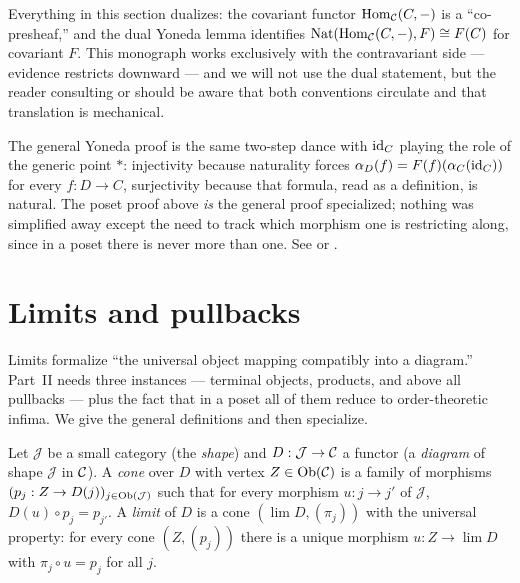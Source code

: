 \begin{remark}\label{ch02:rem:covariant-yoneda}
Everything in this section dualizes: the covariant functor
$\mathrm{Hom}_{\mathcal{C}}(C, -)$ is a ``co-presheaf,'' and the dual Yoneda lemma
identifies $\mathrm{Nat}(\mathrm{Hom}_{\mathcal{C}}(C, -), F) \cong F(C)$ for
covariant $F$. This monograph works exclusively with the
contravariant side --- evidence restricts downward --- and we will
not use the dual statement, but the reader consulting
\cite{maclanecwm} or \cite{riehl} should be aware that both
conventions circulate and that translation is mechanical.
\end{remark}

\begin{remark}\label{ch02:rem:yoneda-general}
The general Yoneda proof is the same two-step dance with $\mathrm{id}_C$
playing the role of the generic point $\ast$: injectivity because
naturality forces $\alpha_D(f) = F(f)(\alpha_C(\mathrm{id}_C))$ for every
$f : D \to C$, surjectivity because that formula, read as a
definition, is natural. The poset proof above \emph{is} the general
proof specialized; nothing was simplified away except the need to
track which morphism one is restricting along, since in a poset there
is never more than one. See \cite[Ch.~2]{riehl} or
\cite[Ch.~8]{awodey}.
\end{remark}

\section{Limits and pullbacks}\label{ch02:sec:limits}

Limits formalize ``the universal object mapping compatibly into a
diagram.'' Part~II needs three instances --- terminal objects, products,
and above all pullbacks --- plus the fact that in a poset all of them
reduce to order-theoretic infima. We give the general definitions and
then specialize.

\begin{definition}\label{ch02:def:limit}
Let $\mathcal{J}$ be a small category (the \emph{shape}) and
$D : \mathcal{J} \to \mathcal{C}$ a functor (a \emph{diagram} of shape
$\mathcal{J}$ in $\mathcal{C}$). A \emph{cone} over $D$ with vertex
$Z \in \mathrm{Ob}(\mathcal{C})$ is a family of morphisms
$(p_j : Z \to D(j))_{j \in \mathrm{Ob}(\mathcal{J})}$ such that for every
morphism $u : j \to j'$ of $\mathcal{J}$,
$D(u) \circ p_j = p_{j'}$. A \emph{limit} of $D$ is a cone
$(\lim D, (\pi_j))$ with the universal property: for every cone
$(Z, (p_j))$ there is a unique morphism $u : Z \to \lim D$ with
$\pi_j \circ u = p_j$ for all $j$.
\end{definition}

